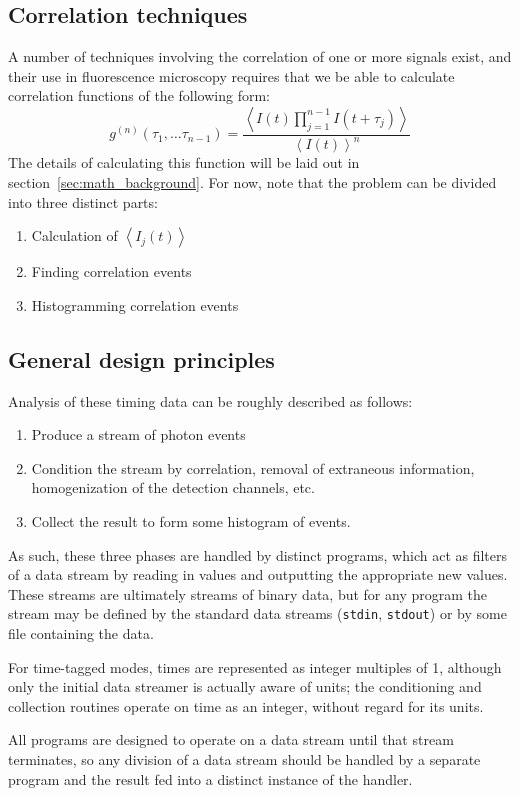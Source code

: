 \documentclass{article}
\newcommand{\angles}[1]{\ensuremath{\left\langle #1 \right\rangle}}
\newcommand{\stdin}{\texttt{stdin}}
\newcommand{\stdout}{\texttt{stdout}}
\newcommand{\gn}[1]{\ensuremath{g^{(#1)}}}
\begin{document}
\subsection{Correlation techniques}
A number of techniques involving the correlation of one or more signals exist, and their use in fluorescence microscopy requires that we be able to calculate correlation functions of the following form:
\begin{equation}
\gn{n}(\tau_{1}, \ldots \tau_{n-1}) = \frac
	{\angles{I(t)\prod_{j=1}^{n-1}{I(t+\tau_{j})}}}
	{\angles{I(t)}^{n}}
\end{equation}
The details of calculating this function will be laid out in section~\ref{sec:math_background}. For now, note that the problem can be divided into three distinct parts:
\begin{enumerate}
\item Calculation of \angles{I_{j}(t)}
\item Finding correlation events
\item Histogramming correlation events
\end{enumerate}

\subsection{General design principles}
Analysis of these timing data can be roughly described as follows:
\begin{enumerate}
\item Produce a stream of photon events
\item Condition the stream by correlation, removal of extraneous information, homogenization of the detection channels, etc.
\item Collect the result to form some histogram of events.
\end{enumerate}
As such, these three phases are handled by distinct programs, which act as filters of a data stream by reading in values and outputting the appropriate new values. These streams are ultimately streams of binary data, but for any program the stream may be defined by the standard data streams (\stdin, \stdout) or by some file containing the data. 

For time-tagged modes, times are represented as integer multiples of 1\pico\second, although only the initial data streamer is actually aware of units; the conditioning and collection routines operate on time as an integer, without regard for its units.

All programs are designed to operate on a data stream until that stream terminates, so any division of a data stream should be handled by a separate program and the result fed into a distinct instance of the handler. 
\end{document}
